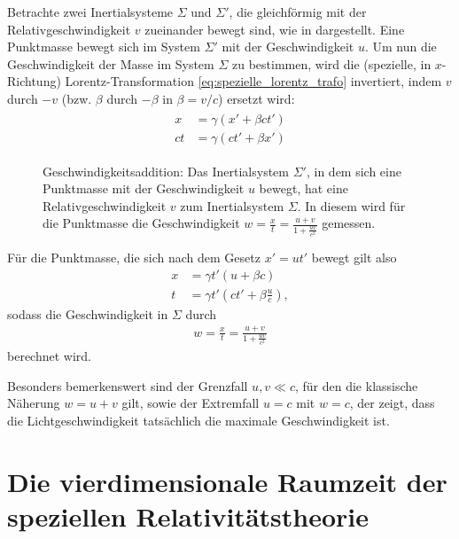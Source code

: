 Betrachte zwei Inertialsysteme $\Sigma$ und $\Sigma'$, die gleichförmig mit der Relativgeschwindigkeit  $v$ zueinander bewegt sind, wie in  dargestellt.
Eine Punktmasse bewegt sich im System $\Sigma'$ mit der Geschwindigkeit $u$.
Um nun die Geschwindigkeit der Masse im System $\Sigma$ zu bestimmen, wird die (spezielle, in $x$-Richtung) Lorentz-Transformation
\eqref{eq:spezielle_lorentz_trafo} invertiert, indem $v$ durch $-v$ (bzw. $\beta$ durch $-\beta$ in $\beta=v/c$) ersetzt wird:
\begin{align}
    \label{eq:spezielle_inv_lorentz_trafo}
    \begin{split}
        x  & =\gamma(x'+\beta ct') \\
        ct & =\gamma(ct'+\beta x')
    \end{split}
\end{align}
\begin{figure}[htp]
    \centering
    \tfigAdditionOfVelocities
    \caption{Geschwindigkeitsaddition: Das Inertialsystem $\Sigma'$, in dem sich eine Punktmasse mit der Geschwindigkeit $u$ bewegt, hat eine Relativgeschwindigkeit $v$ zum Inertialsystem $\Sigma$. In diesem wird für die Punktmasse die Geschwindigkeit $w=\frac{x}{t}=\frac{u+v}{1+\frac{uv}{c^2}}$ gemessen. }
    \label{fig:Geschwindigkeitsaddition}
\end{figure}

Für die Punktmasse, die sich nach dem Gesetz $x'=ut'$ bewegt gilt also
\begin{align*}
    x & =\gamma t'(u+\beta c)              \\
    t & =\gamma t'(ct'+\beta \frac{u}{c}),
\end{align*}
sodass die Geschwindigkeit in $\Sigma$ durch
\begin{align*}
    w=\frac{x}{t}=\frac{u+v}{1+\frac{uv}{c^2}}
\end{align*}
berechnet wird.

Besonders bemerkenswert sind der Grenzfall $u,v\ll c$, für den die klassische Näherung $w=u+v$ gilt, sowie der Extremfall $u=c$ mit $w=c$, der zeigt, dass die Lichtgeschwindigkeit tatsächlich die maximale Geschwindigkeit ist.




\section{Die vierdimensionale Raumzeit der speziellen Relativitätstheorie}

